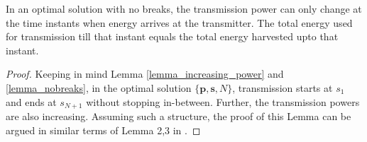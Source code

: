 %
%
%
%
%

\begin{lemma}
In an optimal solution with no breaks, the transmission power can only change at the time instants when energy arrives at the transmitter. The total energy used for transmission till that instant equals the total energy harvested upto that instant.
\label{lemma_energy_consumed} 
\end{lemma}
\begin{proof}
Keeping in mind Lemma \ref{lemma_increasing_power} and \ref{lemma_nobreaks}, in the optimal solution $\{\textbf{p}, \textbf{s}, N\}$, transmission starts at $s_1$ and ends at $s_{N+1}$ without stopping in-between. Further, the transmission powers are also increasing. Assuming such a structure, the proof of this Lemma can be argued in similar terms of Lemma 2,3 in \cite{Yang}. 
\end{proof}	
